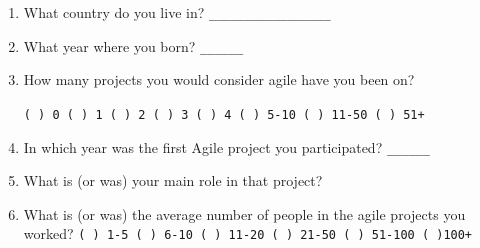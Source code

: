 \documentclass[lnbip]{svmultln}
\begin{document}
\begin{enumerate}
\item What country do you live in? \verb=_________________=
  \vspace{10pt}

\item What year where you born? \verb=______= \vspace{10pt}

\item How many projects you would consider agile have you been on?

  \verb=( ) 0 ( ) 1 ( ) 2 ( ) 3 ( ) 4 ( ) 5-10 ( ) 11-50 ( ) 51+=
  \vspace{10pt}

\item In which year was the first Agile project you participated?
  \verb=______= \vspace{10pt}

\item What is (or was) your main role in that project?
  \vspace{10pt}

\item What is (or was) the average number of people in the agile
  projects you worked?
  \verb=( ) 1-5 ( ) 6-10 ( ) 11-20 ( ) 21-50 ( ) 51-100 ( )100+=
  \vspace{10pt}


\end{enumerate}
\end{document}
